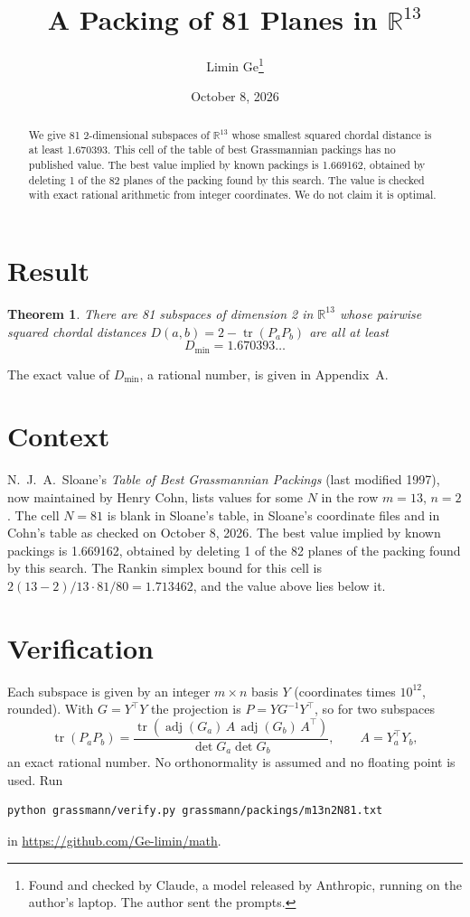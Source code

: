 \documentclass[11pt,a4paper]{article}
\title{A Packing of 81 Planes in $\mathbb{R}^{13}$}
\author{Limin Ge\thanks{Found and checked by Claude, a model released by Anthropic, running on the author's laptop. The author sent the prompts.}}
\date{October 8, 2026}
\newtheorem*{theorem}{Theorem}
\begin{document}
\maketitle
\begin{abstract}
We give 81 2-dimensional subspaces of $\mathbb{R}^{13}$ whose smallest squared chordal distance is at least 1.670393. This cell of the table of best Grassmannian packings has no published value. The best value implied by known packings is 1.669162, obtained by deleting 1 of the 82 planes of the packing found by this search. The value is checked with exact rational arithmetic from integer coordinates. We do not claim it is optimal.
\end{abstract}

\section{Result}
\begin{theorem}
There are 81 subspaces of dimension 2 in $\mathbb{R}^{13}$ whose pairwise squared chordal distances $D(a,b) = 2 - \operatorname{tr}(P_aP_b)$ are all at least
\[ D_{\min} = 1.670393\ldots \]
\end{theorem}
The exact value of $D_{\min}$, a rational number, is given in Appendix~A.


\section{Context}
N.~J.~A.~Sloane's \emph{Table of Best Grassmannian Packings} (last modified 1997), now maintained by Henry Cohn, lists values for some $N$ in the row $m=13$, $n=2$. The cell $N=81$ is blank in Sloane's table, in Sloane's coordinate files and in Cohn's table as checked on October 8, 2026. The best value implied by known packings is 1.669162, obtained by deleting 1 of the 82 planes of the packing found by this search. The Rankin simplex bound for this cell is $2(13-2)/13\cdot 81/80 = 1.713462$, and the value above lies below it.


\section{Verification}
Each subspace is given by an integer $m\times n$ basis $Y$ (coordinates times $10^{12}$, rounded). With $G=Y^\top Y$ the projection is $P=YG^{-1}Y^\top$, so for two subspaces
\[ \operatorname{tr}(P_aP_b)=\frac{\operatorname{tr}(\operatorname{adj}(G_a)\,A\,\operatorname{adj}(G_b)\,A^\top)}{\det G_a\det G_b},\qquad A=Y_a^\top Y_b, \]
an exact rational number. No orthonormality is assumed and no floating point is used. Run
\begin{verbatim}
python grassmann/verify.py grassmann/packings/m13n2N81.txt
\end{verbatim}
in \url{https://github.com/Ge-limin/math}.
\end{document}
